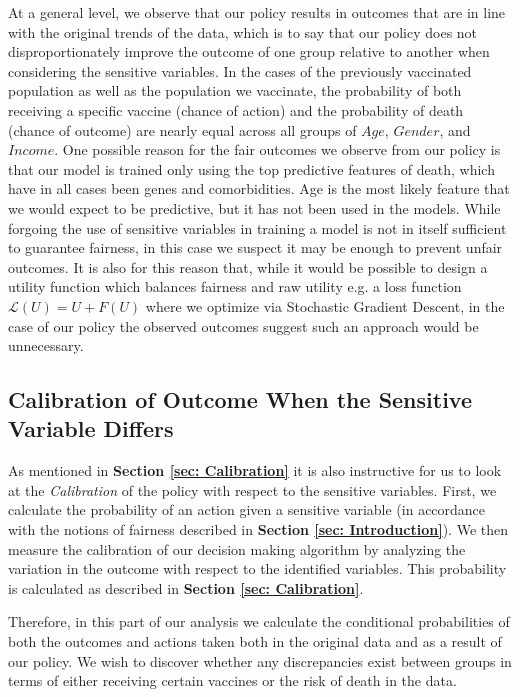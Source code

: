 \documentclass{article}
\begin{document}
At a general level, we observe that our policy results in outcomes that are in line with the original trends of the data, which is to say that our policy does not disproportionately improve the outcome of one group relative to another when considering the sensitive variables. In the cases of the previously vaccinated population as well as the population we vaccinate, the probability of both receiving a specific vaccine (chance of action) and the probability of death (chance of outcome) are nearly equal across all groups of $Age$, $Gender$, and $Income$. One possible reason for the fair outcomes we observe from our policy is that our model is trained only using the top predictive features of death, which have in all cases been genes and comorbidities. Age is the most likely feature that we would expect to be predictive, but it has not been used in the models. While forgoing the use of sensitive variables in training a model is not in itself sufficient to guarantee fairness, in this case we suspect it may be enough to prevent unfair outcomes. It is also for this reason that, while it would be possible to design a utility function which balances fairness and raw utility e.g. a loss function $\mathcal{L}(U) = U + F(U)$ where we optimize via Stochastic Gradient Descent, in the case of our policy the observed outcomes suggest such an approach would be unnecessary.


\subsection{Calibration of Outcome When the Sensitive Variable Differs}

As mentioned in \textbf{Section \ref{sec: Calibration}} it is also instructive for us to look at the \textit{Calibration} of the policy with respect to the sensitive variables. First, we calculate the probability of an action given a sensitive variable (in accordance with the notions of fairness described in \textbf{Section \ref{sec: Introduction}}). We then measure the calibration of our decision making algorithm by analyzing the variation in the outcome with respect to the identified variables. This probability is calculated as described in \textbf{Section \ref{sec: Calibration}}.

Therefore, in this part of our analysis we calculate the conditional probabilities of both the outcomes and actions taken both in the original data and as a result of our policy. We wish to discover whether any discrepancies exist between groups in terms of either receiving certain vaccines or the risk of death in the data. 
\end{document}
